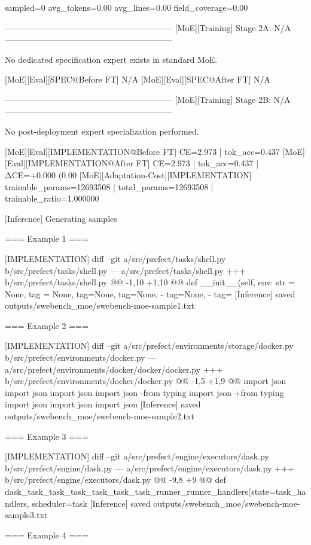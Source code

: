 sampled=0
avg_tokens=0.00
avg_lines=0.00
field_coverage=0.00

------------------------------------------------------------
[MoE][Training] Stage 2A: N/A
------------------------------------------------------------

No dedicated specification expert exists in standard MoE.

[MoE][Eval][SPEC@Before FT] N/A
[MoE][Eval][SPEC@After FT] N/A

------------------------------------------------------------
[MoE][Training] Stage 2B: N/A
------------------------------------------------------------

No post-deployment expert specialization performed.

[MoE][Eval][IMPLEMENTATION@Before FT] CE=2.973 | tok_acc=0.437
[MoE][Eval][IMPLEMENTATION@After FT] CE=2.973 | tok_acc=0.437 | ΔCE=+0.000 (0.00%
[MoE][Adaptation-Cost][IMPLEMENTATION] trainable_params=12693508 | total_params=12693508 | trainable_ratio=1.000000

[Inference] Generating samples

=== Example 1 ===

[IMPLEMENTATION]
diff --git a/src/prefect/tasks/shell.py b/src/prefect/tasks/shell.py --- a/src/prefect/tasks/shell.py +++ b/src/prefect/tasks/shell.py @@ -1,10 +1,10 @@ def __init__(self, env: str = None, tag = None, tag=None, tag=None, - tag=None, - tag=
[Inference] saved outputs/swebench_moe/swebench-moe-sample1.txt

=== Example 2 ===

[IMPLEMENTATION]
diff --git a/src/prefect/environments/storage/docker.py b/src/prefect/environments/docker.py --- a/src/prefect/environments/docker/docker/docker.py +++ b/src/prefect/environments/docker/docker.py @@ -1,5 +1,9 @@ import json import json import json import json -from typing import json +from typing import json import json import json
[Inference] saved outputs/swebench_moe/swebench-moe-sample2.txt

=== Example 3 ===

[IMPLEMENTATION]
diff --git a/src/prefect/engine/executors/dask.py b/src/prefect/engine/dask.py --- a/src/prefect/engine/executors/dask.py +++ b/src/prefect/engine/executors/dask.py @@ -9,8 +9 @@ def dask_task_task_task_task_task_task_runner_runner_handlers(state=task_handlers, scheduler=task
[Inference] saved outputs/swebench_moe/swebench-moe-sample3.txt

=== Example 4 ===

